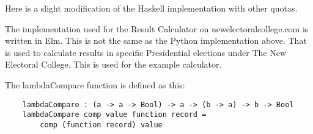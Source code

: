 \documentclass{article}
\begin{document}
    Here is a slight modification of the Haskell implementation with other quotas.

    

    The implementation used for the Result Calculator on newelectoralcollege.com is written in Elm. This is not the same as the Python implementation above. That is used to calculate results in specific Presidential elections under The New Electoral College. This is used for the example calculator.

    

    The lambdaCompare function is defined as this:

    \begin{lstlisting}
    lambdaCompare : (a -> a -> Bool) -> a -> (b -> a) -> b -> Bool
    lambdaCompare comp value function record =
        comp (function record) value
    \end{lstlisting}
\end{document}
